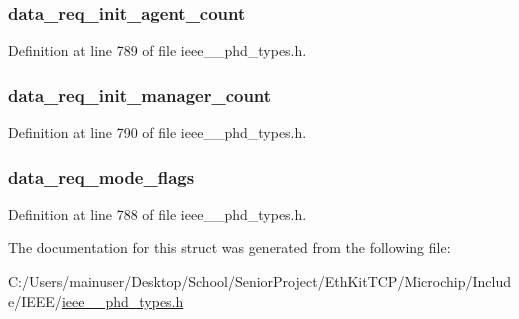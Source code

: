 \subsubsection[{data\+\_\+req\+\_\+init\+\_\+agent\+\_\+count}]{ data\+\_\+req\+\_\+init\+\_\+agent\+\_\+count}\label{struct___data_req_mode_capab_aace4970b609e6b37f685ca441d4f56b1}


Definition at line 789 of file ieee\+\_\+\_\+phd\+\_\+types.\+h.

\hypertarget{struct___data_req_mode_capab_adbd90de31af60ffaaf16f8bd6f6b8cd9}{}
\subsubsection[{data\+\_\+req\+\_\+init\+\_\+manager\+\_\+count}]{ data\+\_\+req\+\_\+init\+\_\+manager\+\_\+count}\label{struct___data_req_mode_capab_adbd90de31af60ffaaf16f8bd6f6b8cd9}


Definition at line 790 of file ieee\+\_\+\_\+phd\+\_\+types.\+h.

\hypertarget{struct___data_req_mode_capab_a4445518892da33a4403dd8657772e34b}{}
\subsubsection[{data\+\_\+req\+\_\+mode\+\_\+flags}]{ data\+\_\+req\+\_\+mode\+\_\+flags}\label{struct___data_req_mode_capab_a4445518892da33a4403dd8657772e34b}


Definition at line 788 of file ieee\+\_\+\_\+phd\+\_\+types.\+h.



The documentation for this struct was generated from the following file\+:\begin{DoxyCompactItemize}
\item 
C\+:/\+Users/mainuser/\+Desktop/\+School/\+Senior\+Project/\+Eth\+Kit\+T\+C\+P/\+Microchip/\+Include/\+I\+E\+E\+E/\hyperlink{ieee__11073__phd__types_8h}{ieee\+\_\+\_\+phd\+\_\+types.\+h}\end{DoxyCompactItemize}
